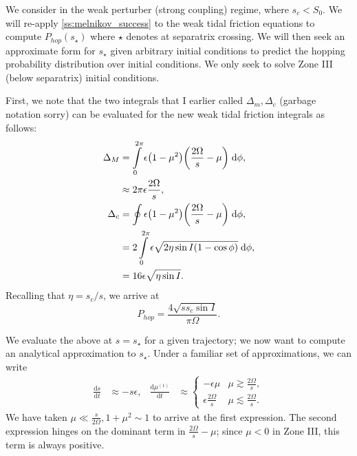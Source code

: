 \documentclass[11pt,
        usenames, %
        dvipsnames %
    ]{article}
\newcommand*{\rd}[2]{\frac{\mathrm{d}#1}{\mathrm{d}#2}}
\DeclarePairedDelimiter\p{\lparen}{\rparen}
\begin{document}
We consider in the weak perturber (strong coupling) regime, where $s_c < S_0$.
We will re-apply \autoref{ss:melnikov_success} to the weak tidal friction
equations to compute $P_{hop}(s_\star)$ where $\star$ denotes at separatrix
crossing. We will then seek an approximate form for $s_{\star}$ given arbitrary
initial conditions to predict the hopping probability distribution over initial
conditions. We only seek to solve Zone III (below separatrix) initial
conditions.

First, we note that the two integrals that I earlier called $\Delta_m, \Delta_c$
(garbage notation sorry) can be evaluated for the new weak tidal friction
integrals as follows:
\begin{align}
    \Delta_M &= \int\limits_0^{2\pi}\epsilon\p*{1 - \mu^2}
            \p*{\frac{2\Omega}{s} - \mu} \;\mathrm{d}\phi,\nonumber\\
        &\approx 2\pi \epsilon \frac{2\Omega}{s},\\
    \Delta_c &= \oint \epsilon \p*{1 - \mu^2}\p*{\frac{2\Omega}{s} - \mu}
            \;\mathrm{d}\phi,\nonumber\\
        &= 2\int\limits_0^{2\pi}
            \epsilon\sqrt{2\eta \sin I\p*{1 - \cos \phi}}\;\mathrm{d}\phi
            ,\nonumber\\
        &= 16\epsilon\sqrt{\eta \sin I}.
\end{align}
Recalling that $\eta = s_c/s$, we arrive at
\begin{equation}
    P_{hop} = \frac{4\sqrt{ss_c\sin I}}{\pi \Omega}.
\end{equation}

We evaluate the above at $s = s_\star$ for a given trajectory; we now want to
compute an analytical approximation to $s_\star$. Under a familiar set of
approximations, we can write
\begin{align*}
    \rd{s}{t} &\approx -s\epsilon,&
    \rd{\mu^{(1)}}{t} &\approx
    \begin{cases}
        -\epsilon\mu & \mu \gtrsim \frac{2\Omega}{s},\\
        \epsilon\frac{2\Omega}{s} & \mu \lesssim \frac{2\Omega}{s}.
    \end{cases}
\end{align*}
We have taken $\mu \ll \frac{s}{2\Omega}, 1 + \mu^2 \sim 1$ to arrive at the
first expression. The second expression hinges on the dominant term in
$\frac{2\Omega}{s} - \mu$; since $\mu < 0$ in Zone III, this term is always
positive.
\end{document}
